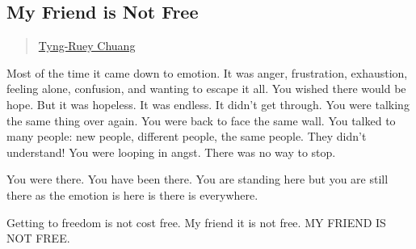 \subsection{My Friend is Not Free}\label{my-friend-is-not-free}

\begin{quote}
\href{../appendix/attributions.html\#tyng-ruey-chuang}{Tyng-Ruey Chuang}
\end{quote}

Most of the time it came down to emotion. It was anger, frustration,
exhaustion, feeling alone, confusion, and wanting to escape it all. You
wished there would be hope. But it was hopeless. It was endless. It
didn't get through. You were talking the same thing over again. You were
back to face the same wall. You talked to many people: new people,
different people, the same people. They didn't understand! You were
looping in angst. There was no way to stop.

You were there. You have been there. You are standing here but you are
still there as the emotion is here is there is everywhere.

Getting to freedom is not cost free. My friend it is not free. MY FRIEND
IS NOT FREE.



